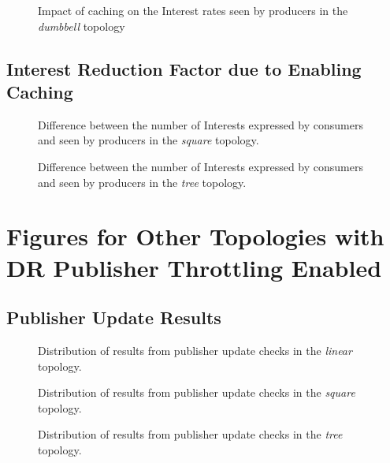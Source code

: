 \begin{appendices}
\begin{figure}[H]
    \centering
    \caption{Impact of caching on the Interest rates seen by producers in the \textit{dumbbell} topology}
\end{figure}

\section{Interest Reduction Factor due to Enabling Caching}
\begin{figure}[H]
    \centering
    \caption{Difference between the number of Interests expressed by consumers and seen by producers in the \textit{square} topology. }
\end{figure}
\begin{figure}[H]
    \centering
    \caption{Difference between the number of Interests expressed by consumers and seen by producers in the \textit{tree} topology. }
\end{figure}

\chapter{Figures for Other Topologies with DR Publisher Throttling Enabled}\label{app:eval:pub-throt}
\section{Publisher Update Results}

\begin{figure}[H]
    \centering
    \caption{Distribution of results from publisher update checks in the \textit{linear} topology.}
\end{figure}

\begin{figure}[H]
    \centering
    \caption{Distribution of results from publisher update checks in the \textit{square} topology.}
\end{figure}

\begin{figure}[H]
    \centering
    \caption{Distribution of results from publisher update checks in the \textit{tree} topology.}
\end{figure}



\end{appendices}
